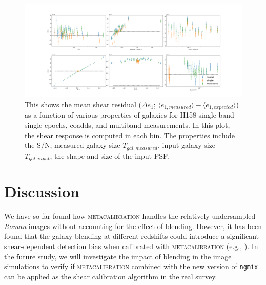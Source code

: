 \documentclass[fleqn,usenatbib]{mnras}
\begin{document}
\begin{figure}
    \hspace*{-3.5cm}
    \centering
	\includegraphics[scale=0.34]{H158_meanshear_measured_properties_perbin_e1.pdf}
    \caption{This shows the mean shear residual ($\Delta e_{1}$; $\langle e_{1,measured} \rangle - \langle e_{1,expected} \rangle$) as a function of various properties of galaxies for H158 single-band single-epochs, coadds, and multiband measurements. In this plot, the shear response is computed in each bin. The properties include the S/N, measured galaxy size $T_{gal,measured}$, input galaxy size $T_{gal,input}$, the shape and size of the input PSF.}
    \label{fig:meanshear}
\end{figure}


\section{Discussion}
\label{sec:discussion}

We have so far found how \textsc{metacalibration} handles the relatively undersampled \emph{Roman} images without accounting for the effect of blending. However, it has been found that the galaxy blending at different redshifts could introduce a significant shear-dependent detection bias when calibrated with \textsc{metacalibration} (e.g., \citealt{2020ApJ...902..138S}). In the future study, we will investigate the impact of blending in the image simulations to verify if \textsc{metacalibration} combined with the new version of \texttt{ngmix} can be applied as the shear calibration algorithm in the real survey. 
\end{document}
